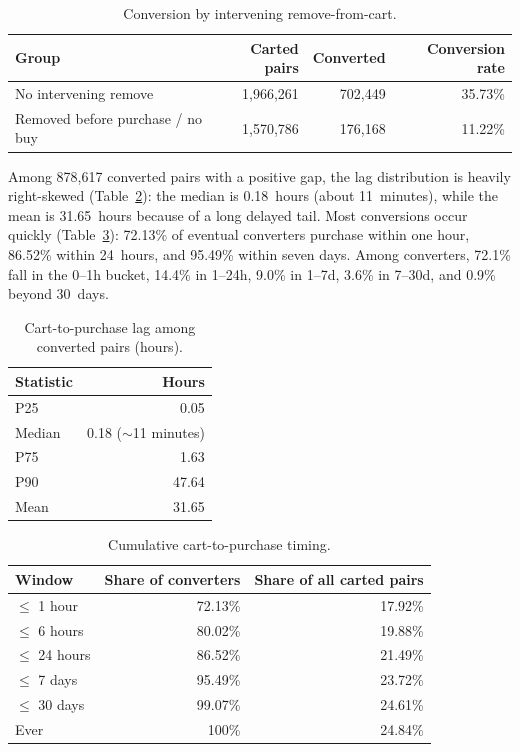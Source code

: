 \documentclass[11pt]{article}
\begin{document}
\begin{table}[h]
\centering
\caption{Conversion by intervening remove-from-cart.}
\label{tab:remove}
\begin{tabular}{lrrr}
\toprule
Group & Carted pairs & Converted & Conversion rate \\
\midrule
No intervening remove & 1,966,261 & 702,449 & 35.73\% \\
Removed before purchase / no buy & 1,570,786 & 176,168 & 11.22\% \\
\bottomrule
\end{tabular}
\end{table}

Among 878,617 converted pairs with a positive gap, the lag distribution is heavily right-skewed (Table~\ref{tab:gap}): the median is 0.18~hours (about 11~minutes), while the mean is 31.65~hours because of a long delayed tail. Most conversions occur quickly (Table~\ref{tab:windows}): 72.13\% of eventual converters purchase within one hour, 86.52\% within 24~hours, and 95.49\% within seven days. Among converters, 72.1\% fall in the 0--1h bucket, 14.4\% in 1--24h, 9.0\% in 1--7d, 3.6\% in 7--30d, and 0.9\% beyond 30~days.

\begin{table}[h]
\centering
\caption{Cart-to-purchase lag among converted pairs (hours).}
\label{tab:gap}
\begin{tabular}{lr}
\toprule
Statistic & Hours \\
\midrule
P25 & 0.05 \\
Median & 0.18 ($\sim$11 minutes) \\
P75 & 1.63 \\
P90 & 47.64 \\
Mean & 31.65 \\
\bottomrule
\end{tabular}
\end{table}

\begin{table}[h]
\centering
\caption{Cumulative cart-to-purchase timing.}
\label{tab:windows}
\begin{tabular}{lrr}
\toprule
Window & Share of converters & Share of all carted pairs \\
\midrule
$\leq$ 1 hour & 72.13\% & 17.92\% \\
$\leq$ 6 hours & 80.02\% & 19.88\% \\
$\leq$ 24 hours & 86.52\% & 21.49\% \\
$\leq$ 7 days & 95.49\% & 23.72\% \\
$\leq$ 30 days & 99.07\% & 24.61\% \\
Ever & 100\% & 24.84\% \\
\bottomrule
\end{tabular}
\end{table}
\end{document}
